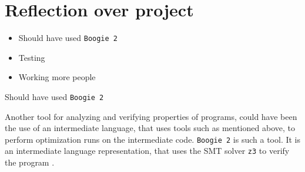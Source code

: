 \section{Reflection over project \ms}


\begin{itemize}
    \item Should have used \texttt{Boogie 2}
    \item Testing
    \item Working more people
\end{itemize}

Should have used \texttt{Boogie 2}

Another tool for analyzing and verifying properties of \lan programs, could have been the use
of an intermediate language, that uses tools such as mentioned above, to perform optimization
runs on the intermediate code. \texttt{Boogie 2} is such a tool. It is an intermediate
language representation, that uses the SMT solver \texttt{z3} to verify the program \cite{boogey}.

